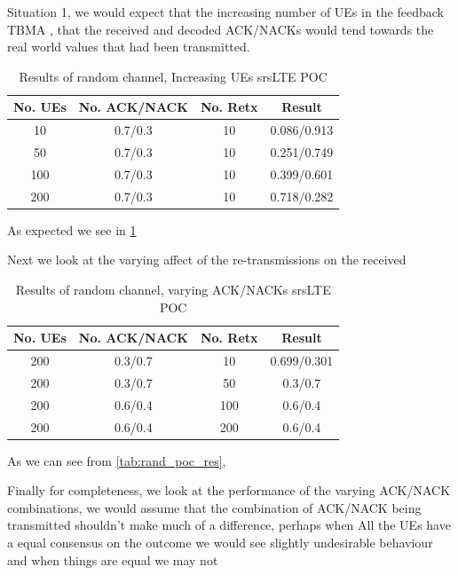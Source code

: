 \documentclass{article}
\begin{document}
Situation 1, we would expect that the increasing number of UEs in the feedback TBMA , that the received and decoded ACK/NACKs would tend towards the real world values that had been transmitted. 

\begin{table}[H]
    \centering
 \begin{tabular}{||c c c c||} 
 \hline
 No. UEs & No. ACK/NACK & No. Retx & Result \\ [0.5ex] 
 \hline\hline
 10 & 0.7/0.3 & 10 &  0.086/0.913 \\ 
 \hline
 50 & 0.7/0.3 & 10 & 0.251/0.749 \\
 \hline
 100 & 0.7/0.3 & 10 & 0.399/0.601 \\
 \hline
 200 & 0.7/0.3 & 10 & 0.718/0.282 \\ [1ex] 
 \hline
\end{tabular}
    \caption{Results of random channel, Increasing UEs srsLTE POC}
    \label{tab:rand_chan_UEs_increase}
\end{table}

As expected we see in \cref{tab:rand_chan_UEs_increase}


Next we look at the varying affect of the re-transmissions on the received 

\begin{table}[H]
    \centering
 \begin{tabular}{||c c c c||} 
 \hline
 No. UEs & No. ACK/NACK & No. Retx & Result \\ [0.5ex] 
 \hline\hline
 200 & 0.3/0.7 & 10 &  0.699/0.301 \\ 
 \hline
 200 & 0.3/0.7 & 50 & 0.3/0.7 \\
 \hline
 200 & 0.6/0.4 & 100 & 0.6/0.4 \\
 \hline
 200 & 0.6/0.4 & 200 & 0.6/0.4 \\ [1ex] 
 \hline
\end{tabular}
    \caption{Results of random channel, varying ACK/NACKs srsLTE POC}
    \label{tab:rand_chan_rtx_increase}
\end{table}

As we can see from \cref{tab:rand_poc_res}, 

Finally for completeness, we look at the performance of the varying ACK/NACK combinations, we would assume that the combination of ACK/NACK being transmitted shouldn't make much of a difference, perhaps when All the UEs have a equal consensus on the outcome we would see slightly undesirable behaviour and when things are equal we may not 
\end{document}
